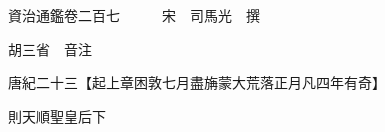 










 


 
 


 

  
  
  
  
  





  
  
  
  
  
 
  

  

  
  
  



  

 
 

  
   




  

  
  


  　　資治通鑑卷二百七　　　宋　司馬光　撰

　　胡三省　音注

　　唐紀二十三【起上章困敦七月盡㫋蒙大荒落正月凡四年有奇】

　　則天順聖皇后下

